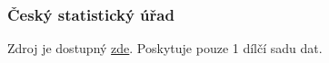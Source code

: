 \documentclass[12pt]{article}
\begin{document}








\subsubsection{Český statistický úřad}
\label{data3}
Zdroj je dostupný \href{https://www.czso.cz/csu/czso/obyvatelstvo-podle-petiletych-vekovych-skupin-a-pohlavi-v-krajich-a-okresech}{zde}. Poskytuje pouze 1 dílčí sadu dat.
\end{document}
